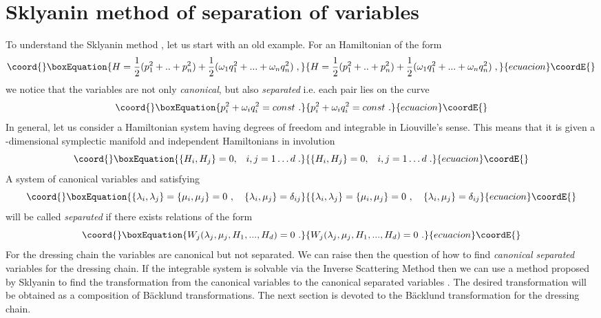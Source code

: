 \documentclass[a4paper,11pt]{article}
\begin{document}
\section{Sklyanin method of separation of variables}
To understand the Sklyanin method \cite{Sklyanin1,Sklyanin2,Sklyanin3,Kuz},
let us start with an old example. For an Hamiltonian of the form
\begin{equation}\coord{}\boxEquation{
\label{oldHam}
H=\frac{1}{2}(p_1^2+..+p_n^2)+\frac{1}{2}(\omega_1q_1^2+...+\omega_nq_n^2)\;,
}{
H=\frac{1}{2}(p_1^2+..+p_n^2)+\frac{1}{2}(\omega_1q_1^2+...+\omega_nq_n^2)\;,
}{ecuacion}\coordE{}\end{equation}
we notice that the variables are not only {\it canonical},
\coordHE{} but also {\it separated} i.e. each pair
\coordHE{} lies on the curve
\begin{equation}\coord{}\boxEquation{
\label{curve}
p_i^2+\omega_iq_i^2=const ~.
}{
p_i^2+\omega_iq_i^2=const ~.
}{ecuacion}\coordE{}\end{equation}
In general, let us consider a Hamiltonian system having \coordHE{} degrees of
freedom and integrable in Liouville's sense. This means that it is given a
\coordHE{}-dimensional symplectic manifold and \coordHE{} independent Hamiltonians \coordHE{}
in involution
\begin{equation}\coord{}\boxEquation{
\label{H_inv}
\{H_i,H_j\}=0,\;\;\;i,j=1 \ldots d\;.
}{
\{H_i,H_j\}=0,\;\;\;i,j=1 \ldots d\;.
}{ecuacion}\coordE{}\end{equation}
A system of canonical variables \coordHE{} and
\coordHE{} satisfying
\begin{equation}\coord{}\boxEquation{
\label{Candeg}
\{\lambda_i,\lambda_j\}=\{\mu_i,\mu_j\}=0~, \quad \{\lambda_i,\mu_j\}=\delta_{ij}
}{
\{\lambda_i,\lambda_j\}=\{\mu_i,\mu_j\}=0~, \quad \{\lambda_i,\mu_j\}=\delta_{ij}
}{ecuacion}\coordE{}\end{equation}
will be called {\it separated} if there exists \coordHE{} relations of the form
\begin{equation}\coord{}\boxEquation{
\label{sep}
W_j(\lambda_j,\mu_j,H_1,...,H_d)=0 ~.
}{
W_j(\lambda_j,\mu_j,H_1,...,H_d)=0 ~.
}{ecuacion}\coordE{}\end{equation}
For the dressing chain the variables \coordHE{} are canonical but not
separated. We can raise then the question of how to find {\it canonical
separated} variables for the dressing chain. If the integrable system is
solvable via the Inverse Scattering Method then we can use a method proposed
by Sklyanin to find the transformation from the canonical variables \coordHE{}
to the canonical separated variables \myHighlight{$(\lambda,\mu)$}\coordHE{}. The desired
transformation will be obtained as a composition of B\"acklund
transformations. The next section is devoted to the B\"acklund
transformation for the dressing chain.
\end{document}
